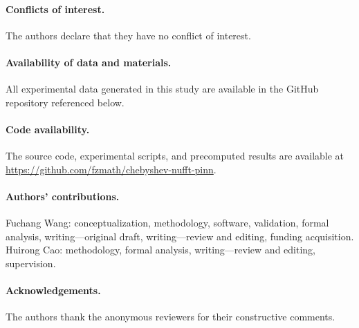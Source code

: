 \documentclass[sn-mathphys,Numbered]{sn-jnl}
\theoremstyle{thmstyleone}
\theoremstyle{thmstyletwo}
\theoremstyle{thmstylethree}
\begin{document}
\paragraph{Conflicts of interest.}
The authors declare that they have no conflict of interest.

\paragraph{Availability of data and materials.}
All experimental data generated in this study are available in the GitHub repository referenced below.

\paragraph{Code availability.}
The source code, experimental scripts, and precomputed results are available at \url{https://github.com/fzmath/chebyshev-nufft-pinn}.

\paragraph{Authors' contributions.}
Fuchang Wang: conceptualization, methodology, software, validation, formal analysis, writing---original draft, writing---review and editing, funding acquisition. Huirong Cao: methodology, formal analysis, writing---review and editing, supervision.

\paragraph{Acknowledgements.}
The authors thank the anonymous reviewers for their constructive comments.


\end{document}
